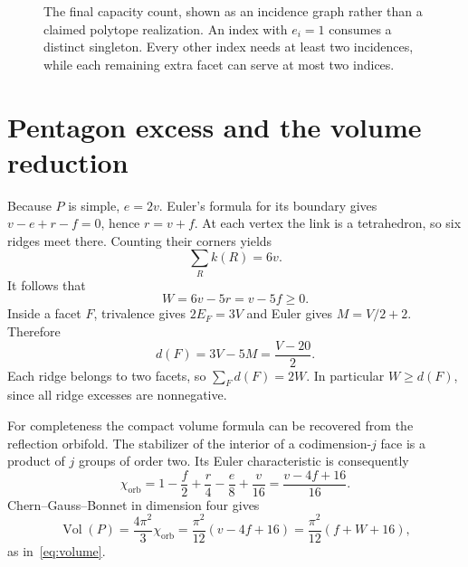 \documentclass[11pt]{article}
\theoremstyle{remark}
\newcommand{\Vol}{\operatorname{Vol}}
\begin{document}
\begin{figure}[tb]
\centering
{}
\caption{The final capacity count, shown as an incidence graph rather
than a claimed polytope realization. An index with $e_i=1$ consumes a
distinct singleton. Every other index needs at least two incidences,
while each remaining extra facet can serve at most two indices.}
\label{fig:capacity}
\end{figure}

\section{Pentagon excess and the volume reduction}

Because $P$ is simple, $e=2v$. Euler's formula for its boundary gives
$v-e+r-f=0$, hence $r=v+f$. At each vertex the link is a tetrahedron,
so six ridges meet there. Counting their corners yields
\[
 \sum_R k(R)=6v.
\]
It follows that
\[
 W=6v-5r=v-5f\ge0.
\]
Inside a facet $F$, trivalence gives $2E_F=3V$ and Euler gives
$M=V/2+2$. Therefore
\begin{equation}\label{eq:facet-excess}
 d(F)=3V-5M=\frac{V-20}{2}.
\end{equation}
Each ridge belongs to two facets, so $\sum_Fd(F)=2W$. In particular
$W\ge d(F)$, since all ridge excesses are nonnegative.

For completeness the compact volume formula can be recovered from the
reflection orbifold. The stabilizer of the interior of a codimension-$j$
face is a product of $j$ groups of order two. Its Euler characteristic
is consequently
\[
 \chi_{\mathrm{orb}}
 =1-\frac f2+\frac r4-\frac e8+\frac v{16}
 =\frac{v-4f+16}{16}.
\]
Chern--Gauss--Bonnet in dimension four gives
\[
 \Vol(P)=\frac{4\pi^2}{3}\chi_{\mathrm{orb}}
 =\frac{\pi^2}{12}(v-4f+16)
 =\frac{\pi^2}{12}(f+W+16),
\]
as in~\eqref{eq:volume}.
\end{document}
